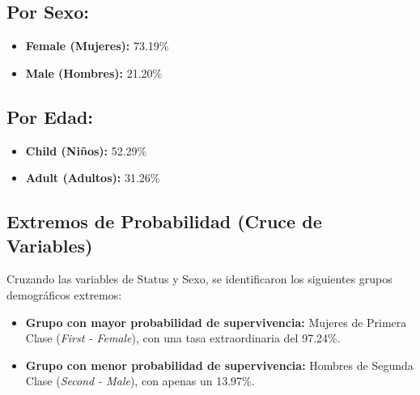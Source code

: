\documentclass[letterpaper,11pt]{article}
\begin{document}
\subsection*{Por Sexo:}
\begin{itemize}
    \item \textbf{Female (Mujeres):} 73.19\%
    \item \textbf{Male (Hombres):} 21.20\%
\end{itemize}

\subsection*{Por Edad:}
\begin{itemize}
    \item \textbf{Child (Niños):} 52.29\%
    \item \textbf{Adult (Adultos):} 31.26\%
\end{itemize}

\subsection{Extremos de Probabilidad (Cruce de Variables)}
Cruzando las variables de Status y Sexo, se identificaron los siguientes grupos demográficos extremos:
\begin{itemize}
    \item \textbf{Grupo con mayor probabilidad de supervivencia:} Mujeres de Primera Clase (\textit{First - Female}), con una tasa extraordinaria del 97.24\%.
    \item \textbf{Grupo con menor probabilidad de supervivencia:} Hombres de Segunda Clase (\textit{Second - Male}), con apenas un 13.97\%.
\end{itemize}
\end{document}
